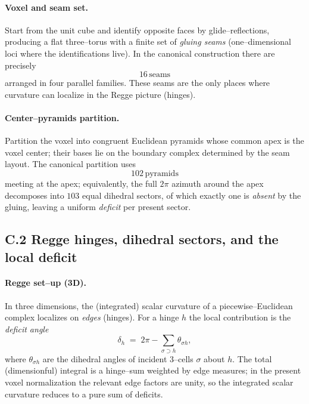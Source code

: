 \documentclass[11pt]{article}
\begin{document}
\begin{proposition}
\paragraph{Voxel and seam set.}
Start from the unit cube and identify opposite faces by glide–reflections, producing a flat three–torus with a finite set of \emph{gluing seams} (one–dimensional loci where the identifications live). In the canonical construction there are precisely
\[
\boxed{\,16\,\text{seams}\,}
\]
arranged in four parallel families. These seams are the only places where curvature can localize in the Regge picture (hinges).%

\paragraph{Center–pyramids partition.}
Partition the voxel into congruent Euclidean pyramids whose common apex is the voxel center; their bases lie on the boundary complex determined by the seam layout. The canonical partition uses
\[
\boxed{\,102\,\text{pyramids}\,}
\]
meeting at the apex; equivalently, the full $2\pi$ azimuth around the apex decomposes into $103$ equal dihedral sectors, of which exactly one is \emph{absent} by the gluing, leaving a uniform \emph{deficit} per present sector.%

\subsection*{C.2  Regge hinges, dihedral sectors, and the local deficit}

\paragraph{Regge set–up (3D).}
In three dimensions, the (integrated) scalar curvature of a piecewise–Euclidean complex localizes on \emph{edges} (hinges). For a hinge $h$ the local contribution is the \emph{deficit angle}
\[
\delta_h \;=\; 2\pi - \sum_{\sigma\supset h}\theta_{\sigma h},
\]
where $\theta_{\sigma h}$ are the dihedral angles of incident 3–cells $\sigma$ about $h$. The total (dimensionful) integral is a hinge–sum weighted by edge measures; in the present voxel normalization the relevant edge factors are unity, so the integrated scalar curvature reduces to a pure sum of deficits.


\end{proposition}
\end{document}
